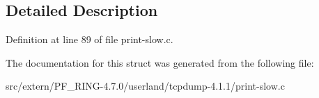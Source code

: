 \subsection{Detailed Description}


Definition at line 89 of file print-\/slow.c.



The documentation for this struct was generated from the following file:\begin{DoxyCompactItemize}
\item 
src/extern/PF\_\-RING-\/4.7.0/userland/tcpdump-\/4.1.1/print-\/slow.c\end{DoxyCompactItemize}
